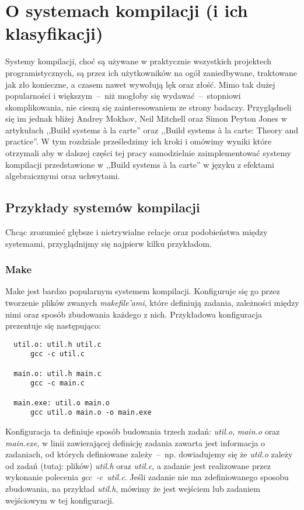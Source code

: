 
\chapter{O systemach kompilacji (i ich klasyfikacji)}

Systemy kompilacji, choć są używane w praktycznie wszystkich projektech programistycznych, są przez ich użytkowników na ogół zaniedbywane, traktowane jak zło konieczne, a czasem nawet wywołują lęk oraz złość. Mimo tak dużej popularności i większym~--~niż mogłoby się wydawać~--~stopniowi skomplikowania, nie cieszą się zainteresowaniem ze strony badaczy. Przyglądneli się im jednak bliżej Andrey Mokhov, Neil Mitchell oraz Simon Peyton Jones w artykułach ,,Build systems {\`a} la carte''\cite{mokhov2018build} oraz ,,Build systems {\`a} la carte: Theory and practice''\cite{mokhov2020build}. W tym rozdziale prześledzimy ich kroki i omówimy wyniki które otrzymali aby w dalszej części tej pracy samodzielnie zaimplementować systemy kompilacji przedstawione w ,,Build systems {\`a} la carte'' w języku z efektami algebraicznymi oraz uchwytami.

\section{Przykłady systemów kompilacji}

Chcąc zrozumieć głębsze i nietrywialne relacje oraz podobieństwa między systemami, przyglądnijmy się najpierw kilku przykładom.

\subsection{Make}

Make jest bardzo popularnym systemem kompilacji. Konfiguruje się go przez tworzenie plików zwanych \textit{makefile'ami}, które definiują zadania, zależności między nimi oraz sposób zbudowania każdego z nich. Przykładowa konfiguracja prezentuje się następująco:

\lstset{language=make}

\begin{lstlisting}
  util.o: util.h util.c
      gcc -c util.c

  main.o: util.h main.c
      gcc -c main.c

  main.exe: util.o main.o
      gcc util.o main.o -o main.exe
\end{lstlisting}

Konfiguracja ta definiuje sposób budowania trzech zadań: \textit{util.o}, \textit{main.o} oraz \textit{main.exe}, w linii zawierającej definicję zadania zawarta jest informacja o zadaniach, od których definiowane zależy~--~np. dowiadujemy się że \textit{util.o} zależy od zadań (tutaj: plików) \textit{util.h} oraz \textit{util.c}, a zadanie jest realizowane przez wykonanie polecenia \textit{gcc~\nobreakdash-c~util.c}. Jeśli zadanie nie ma zdefiniowanego sposobu zbudowania, na przykład \textit{util.h}, mówimy że jest wejściem lub zadaniem wejściowym w tej konfiguracji.

